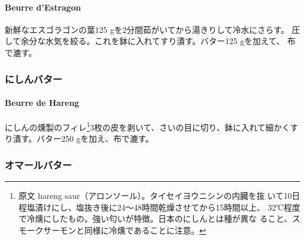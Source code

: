 \begin{recette}
\hypertarget{beurre-d-estragon}{%
\paragraph{Beurre d'Estragon}\label{beurre-d-estragon}}


新鮮なエスゴラゴンの葉125 gを2分間茹がいてから湯きりして冷水にさらす。
圧して余分な水気を絞る。これを鉢に入れてすり潰す。バター125 gを加えて、
布で漉す。

\maeaki

\hypertarget{ux306bux3057ux3093ux30d0ux30bfux30fc}{%
\subsubsection{にしんバター}\label{ux306bux3057ux3093ux30d0ux30bfux30fc}}

\hypertarget{beurre-de-hereng}{%
\paragraph{Beurre de Hareng}\label{beurre-de-hereng}}


にしんの燻製のフィレ\footnote{原文 hareng
  saur（アロンソール）。タイセイヨウニシンの内臓を抜
  いて10日程塩漬けにし、塩抜き後に24〜48時間乾燥させてから15時間以上、
  32℃程度で冷燻にしたもの。強い匂いが特徴。日本のにしんとは種が異な
  ること、スモークサーモンと同様に冷燻であることに注意。}3枚の皮を剥いて、さいの目に切り、鉢に入れて細かくすり潰す。バター250
gを加え、布で漉す。

\maeaki

\hypertarget{ux30aaux30deux30fcux30ebux30d0ux30bfux30fc}{%
\subsubsection{オマールバター}\label{ux30aaux30deux30fcux30ebux30d0ux30bfux30fc}}


\end{recette}
